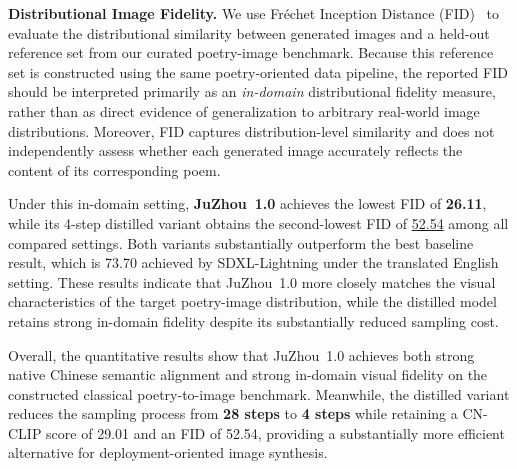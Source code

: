 
\textbf{Distributional Image Fidelity.}
We use Fr\'echet Inception Distance (FID)~\cite{fid2023rethinking} to evaluate the distributional similarity between generated images and a held-out reference set from our curated poetry-image benchmark. Because this reference set is constructed using the same poetry-oriented data pipeline, the reported FID should be interpreted primarily as an \emph{in-domain} distributional fidelity measure, rather than as direct evidence of generalization to arbitrary real-world image distributions. Moreover, FID captures distribution-level similarity and does not independently assess whether each generated image accurately reflects the content of its corresponding poem.

Under this in-domain setting, \textbf{JuZhou~1.0} achieves the lowest FID of \textbf{26.11}, while its 4-step distilled variant obtains the second-lowest FID of \underline{52.54} among all compared settings. Both variants substantially outperform the best baseline result, which is 73.70 achieved by SDXL-Lightning under the translated English setting. These results indicate that JuZhou~1.0 more closely matches the visual characteristics of the target poetry-image distribution, while the distilled model retains strong in-domain fidelity despite its substantially reduced sampling cost.

Overall, the quantitative results show that JuZhou~1.0 achieves both strong native Chinese semantic alignment and strong in-domain visual fidelity on the constructed classical poetry-to-image benchmark. Meanwhile, the distilled variant reduces the sampling process from \textbf{28 steps} to \textbf{4 steps} while retaining a CN-CLIP score of 29.01 and an FID of 52.54, providing a substantially more efficient alternative for deployment-oriented image synthesis.

